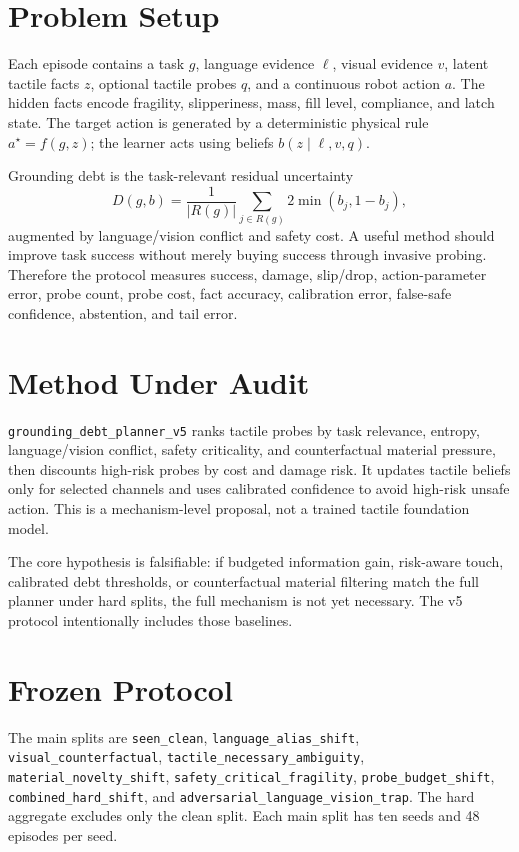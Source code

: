 \documentclass{article}
\begin{document}
\section{Problem Setup}
Each episode contains a task $g$, language evidence $\ell$, visual evidence $v$, latent tactile facts $z$, optional tactile probes $q$, and a continuous robot action $a$. The hidden facts encode fragility, slipperiness, mass, fill level, compliance, and latch state. The target action is generated by a deterministic physical rule $a^\star=f(g,z)$; the learner acts using beliefs $b(z\mid \ell,v,q)$.

Grounding debt is the task-relevant residual uncertainty
\[
D(g,b)=\frac{1}{|R(g)|}\sum_{j\in R(g)} 2\min(b_j,1-b_j),
\]
augmented by language/vision conflict and safety cost. A useful method should improve task success without merely buying success through invasive probing. Therefore the protocol measures success, damage, slip/drop, action-parameter error, probe count, probe cost, fact accuracy, calibration error, false-safe confidence, abstention, and tail error.

\section{Method Under Audit}
\texttt{grounding\_debt\_planner\_v5} ranks tactile probes by task relevance, entropy, language/vision conflict, safety criticality, and counterfactual material pressure, then discounts high-risk probes by cost and damage risk. It updates tactile beliefs only for selected channels and uses calibrated confidence to avoid high-risk unsafe action. This is a mechanism-level proposal, not a trained tactile foundation model.

The core hypothesis is falsifiable: if budgeted information gain, risk-aware touch, calibrated debt thresholds, or counterfactual material filtering match the full planner under hard splits, the full mechanism is not yet necessary. The v5 protocol intentionally includes those baselines.

\section{Frozen Protocol}
The main splits are \texttt{seen\_clean}, \texttt{language\_alias\_shift}, \texttt{visual\_counterfactual}, \texttt{tactile\_necessary\_ambiguity}, \texttt{material\_novelty\_shift}, \texttt{safety\_critical\_fragility}, \texttt{probe\_budget\_shift}, \texttt{combined\_hard\_shift}, and \texttt{adversarial\_language\_vision\_trap}. The hard aggregate excludes only the clean split. Each main split has ten seeds and 48 episodes per seed.
\end{document}
